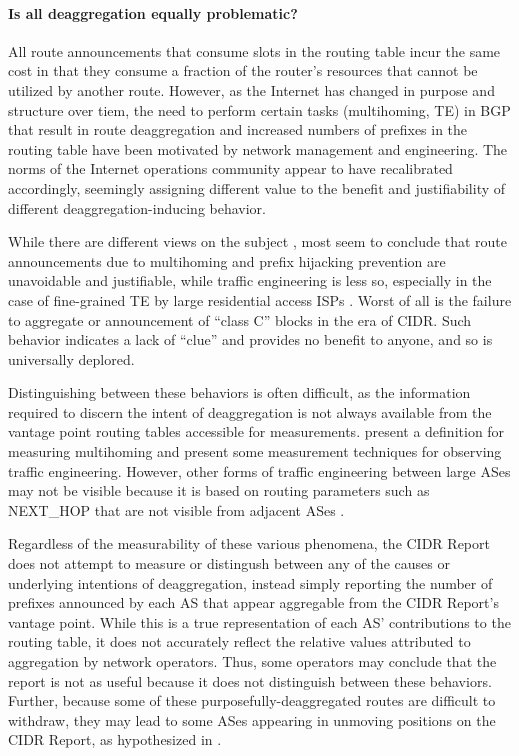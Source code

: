 \paragraph{Is all deaggregation equally problematic?}
All route announcements that consume slots in the routing table incur the same
cost in that they consume a fraction of the router's resources that cannot be
utilized by another route. However, as the Internet has changed in purpose and
structure over tiem, the need to perform certain tasks (multihoming, TE) in BGP
that result in route deaggregation and increased numbers of prefixes in the
routing table have been motivated by network management and engineering. The
norms of the Internet operations community appear to have recalibrated
accordingly, seemingly assigning different value to the benefit and
justifiability of different deaggregation-inducing behavior.

While there are different views on the subject \cite{Li:2011vn}, most seem to
conclude that route announcements due to multihoming and prefix hijacking
prevention are unavoidable and justifiable, while traffic engineering is less
so, especially in the case of fine-grained TE by large residential access ISPs
\cite{Steenbergen:2010nx}. Worst of all is the failure to aggregate or
announcement of ``class C'' blocks in the era of CIDR. Such behavior indicates
a lack of ``clue'' and provides no benefit to anyone, and so is universally
deplored.

Distinguishing between these behaviors is often difficult, as the information
required to discern the intent of deaggregation is not always available from
the vantage point routing tables accessible for measurements. \cite{Bu:2004fk}
present a definition for measuring multihoming and \cite{Cittadini:2010pi}
present some measurement techniques for observing traffic engineering. However,
other forms of traffic engineering between large ASes may not be visible
because it is based on routing parameters such as NEXT\_HOP that are not
visible from adjacent ASes \cite{Steenbergen:2010nx}.

Regardless of the measurability of these various phenomena, the CIDR Report
does not attempt to measure or distingush between any of the causes or
underlying intentions of deaggregation, instead simply reporting the number of
prefixes announced by each AS that appear aggregable from the CIDR Report's
vantage point. While this is a true representation of each AS' contributions to
the routing table, it does not accurately reflect the relative values
attributed to aggregation by network operators. Thus, some operators may
conclude that the report is not as useful because it does not distinguish
between these behaviors. Further, because some of these
purposefully-deaggregated routes are difficult to withdraw, they may lead to
some ASes appearing in unmoving positions on the CIDR Report, as hypothesized
in \cite{Steenbergen:2010nx}.


